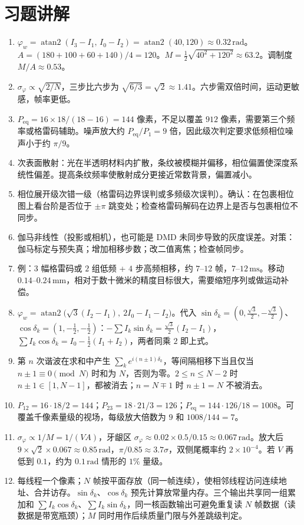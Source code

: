 \section{习题讲解}
\label{sec:ch06-solutions}

\begin{enumerate}
  \item $\varphi_w=\operatorname{atan2}(I_3-I_1,\,I_0-I_2)=\operatorname{atan2}(40,120)\approx0.32\,\mathrm{rad}$。$A=(180+100+60+140)/4=120$。$M=\tfrac12\sqrt{40^2+120^2}\approx63.2$。调制度 $M/A\approx0.53$。
  \item $\sigma_\varphi\propto\sqrt{2/N}$，三步比六步为 $\sqrt{6/3}=\sqrt2\approx1.41$。六步需双倍时间，运动更敏感，帧率更低。
  \item $P_{\mathrm{eq}}=16\times18/(18-16)=144$ 像素，不足以覆盖 $912$ 像素，需要第三个频率或格雷码辅助。噪声放大约 $P_{\mathrm{eq}}/P_1=9$ 倍，因此级次判定要求低频相位噪声小于约 $\pi/9$。
  \item 次表面散射：光在半透明材料内扩散，条纹被模糊并偏移，相位偏置使深度系统性偏差。提高条纹频率使散射成分更接近常数背景，偏置减小。
  \item 相位展开级次错一级（格雷码边界误判或多频级次误判）。确认：在包裹相位图上看台阶是否位于 $\pm\pi$ 跳变处；检查格雷码解码在边界上是否与包裹相位不同步。
  \item 伽马非线性（投影或相机），也可能是 DMD 未同步导致的灰度误差。对策：伽马标定与预失真；增加相移步数；改二值离焦；检查帧同步。
  \item 例：$3$ 幅格雷码或 $2$ 组低频 + $4$ 步高频相移，约 $7$--$12$ 帧，$7$--$12\,\mathrm{ms}$。移动 $0.14$--$0.24\,\mathrm{mm}$，相对于数十微米的精度目标很大，需要缩短序列或做运动补偿。
  \item $\varphi_w=\operatorname{atan2}\bigl(\sqrt3(I_2-I_1),\ 2I_0-I_1-I_2\bigr)$。代入 $\sin\delta_k=(0,\tfrac{\sqrt3}2,-\tfrac{\sqrt3}2)$、$\cos\delta_k=(1,-\tfrac12,-\tfrac12)$：$-\sum I_k\sin\delta_k=\tfrac{\sqrt3}2(I_2-I_1)$，$\sum I_k\cos\delta_k=I_0-\tfrac12(I_1+I_2)$，两者同乘 $2$ 即上式。
  \item 第 $n$ 次谐波在求和中产生 $\sum_k e^{i(n\pm1)\delta_k}$，等间隔相移下当且仅当 $n\pm1\equiv0\pmod N$ 时和为 $N$，否则为零。$2\le n\le N-2$ 时 $n\pm1\in[1,N-1]$，都被消去；$n=N\mp1$ 时 $n\pm1=N$ 不被消去。
  \item $P_{12}=16\cdot18/2=144$；$P_{23}=18\cdot21/3=126$；$P_{\mathrm{eq}}=144\cdot126/18=1008$。可覆盖千像素量级的视场，每级放大倍数为 $9$ 和 $1008/144=7$。
  \item $\sigma_\varphi\propto1/M=1/(VA)$，牙龈区 $\sigma_\varphi\approx0.02\times0.5/0.15\approx0.067\,\mathrm{rad}$。放大后 $9\times\sqrt2\times0.067\approx0.85\,\mathrm{rad}$，$\pi/0.85\approx3.7\sigma$，双侧尾概率约 $2\times10^{-4}$。若 $V$ 再低到 $0.1$，约为 $0.1\,\mathrm{rad}$ 情形的 $1\%$ 量级。
  \item 每线程一个像素；$N$ 帧按平面存放（同一帧连续），使相邻线程访问连续地址、合并访存。$\sin\delta_k$、$\cos\delta_k$ 预先计算放常量内存。三个输出共享同一组累加和 $\sum I_k\cos\delta_k$、$\sum I_k\sin\delta_k$，同一核函数输出可避免重复读 $N$ 帧数据（读数据是带宽瓶颈）；$M$ 同时用作后续质量门限与外差跳级判定。
\end{enumerate}
